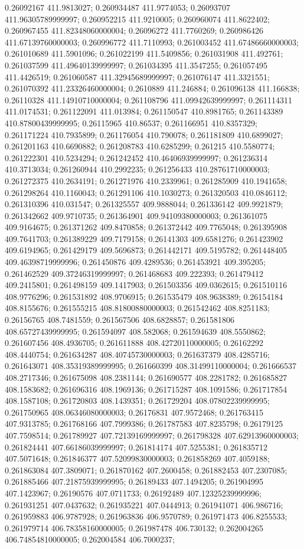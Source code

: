 0.26092167 411.9813027; 0.260934487 411.9774053; 0.26093707 411.96305789999997; 0.260952215 411.9210005; 0.260960074 411.8622402; 0.260967455 411.82348060000004; 0.26096272 411.7760269; 0.260986426 411.67139760000003; 0.260996772 411.7110993; 0.261003452 411.67486660000003; 0.261010689 411.5901096; 0.261022199 411.5409856; 0.261031908 411.492761; 0.261037599 411.49640139999997; 0.261034395 411.3547255; 0.261057495 411.4426519; 0.261060587 411.32945689999997; 0.261076147 411.3321551; 0.261070392 411.23326460000004; 0.2610889 411.246884; 0.261096138 411.166838; 0.26110328 411.14910710000004; 0.261108796 411.09942639999997; 0.261114311 411.0174531; 0.261122091 411.013984; 0.261150547 410.8981765; 0.261143389 410.87800439999995; 0.26115965 410.86537; 0.261166951 410.8357329; 0.261171224 410.7935899; 0.261176054 410.790078; 0.261181809 410.6899027; 0.261201163 410.6690882; 0.261208783 410.6285299; 0.261215 410.5580774; 0.261222301 410.5234294; 0.261242452 410.46406939999997; 0.261236314 410.3713034; 0.261260944 410.2992235; 0.261256433 410.28761710000003; 0.261272375 410.2634191; 0.261271976 410.2339961; 0.261285909 410.1941658; 0.261298264 410.1160043; 0.261291106 410.1030273; 0.261320503 410.0846112; 0.261310396 410.031547; 0.261325557 409.9888044; 0.261336142 409.9921879; 0.261342662 409.9710735; 0.261364901 409.94109380000003; 0.261361075 409.9164675; 0.261371262 409.8470858; 0.261372442 409.7765048; 0.261395908 409.7641703; 0.261389229 409.7179158; 0.26141303 409.6581276; 0.261423902 409.6194965; 0.261429179 409.5696873; 0.261442171 409.5195782; 0.261448405 409.46398719999996; 0.261450876 409.4289536; 0.261453921 409.395205; 0.261462529 409.37246319999997; 0.261468683 409.222393; 0.261479412 409.2415801; 0.261498159 409.1417903; 0.261503356 409.0362615; 0.261510116 408.9776296; 0.261531892 408.9706915; 0.261535479 408.9638389; 0.26154184 408.8155676; 0.261555215 408.81800880000003; 0.261542462 408.8251183; 0.26156765 408.7481559; 0.261567506 408.6828857; 0.261581806 408.65727439999995; 0.261594097 408.582068; 0.261594639 408.5550862; 0.261607456 408.4936705; 0.261611888 408.42720110000005; 0.26162292 408.4440754; 0.261634287 408.40745730000003; 0.261637379 408.4285716; 0.261643071 408.35319389999995; 0.261660399 408.31499110000004; 0.261666537 408.2717346; 0.261675098 408.2381144; 0.261690577 408.2281782; 0.261685827 408.1583682; 0.261696316 408.1969136; 0.261715287 408.1091586; 0.261717854 408.1587108; 0.261720803 408.1439351; 0.261729204 408.07802239999995; 0.261750965 408.06346080000003; 0.26176831 407.9572468; 0.261763415 407.9313785; 0.261768166 407.7999386; 0.261787583 407.8235798; 0.26179125 407.7598514; 0.261789927 407.72139169999997; 0.261798328 407.62913960000003; 0.261824441 407.66186039999997; 0.261814174 407.5255381; 0.261835712 407.5071648; 0.261846377 407.52099830000003; 0.261858269 407.4059188; 0.261863084 407.3809071; 0.261870162 407.2600458; 0.261882453 407.2307085; 0.261885466 407.21875939999995; 0.26189433 407.1494205; 0.261904995 407.1423967; 0.26190576 407.0711733; 0.26192489 407.12325239999996; 0.261931251 407.0437632; 0.261935221 407.0444913; 0.261941071 406.986716; 0.261959883 406.9787928; 0.261963836 406.9570789; 0.261971473 406.8255533; 0.261979714 406.78358160000005; 0.261987478 406.730132; 0.262004265 406.74854810000005; 0.262004584 406.7000237; 